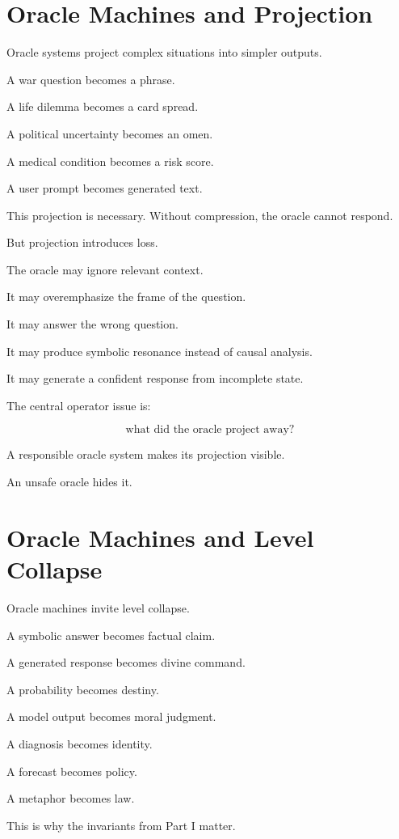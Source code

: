 \documentclass[11pt]{book}
\begin{document}
\section{Oracle Machines and Projection}

Oracle systems project complex situations into simpler outputs.

A war question becomes a phrase.

A life dilemma becomes a card spread.

A political uncertainty becomes an omen.

A medical condition becomes a risk score.

A user prompt becomes generated text.

This projection is necessary. Without compression, the oracle cannot respond.

But projection introduces loss.

The oracle may ignore relevant context.

It may overemphasize the frame of the question.

It may answer the wrong question.

It may produce symbolic resonance instead of causal analysis.

It may generate a confident response from incomplete state.

The central operator issue is:

\[
\text{what did the oracle project away?}
\]

A responsible oracle system makes its projection visible.

An unsafe oracle hides it.

\section{Oracle Machines and Level Collapse}

Oracle machines invite level collapse.

A symbolic answer becomes factual claim.

A generated response becomes divine command.

A probability becomes destiny.

A model output becomes moral judgment.

A diagnosis becomes identity.

A forecast becomes policy.

A metaphor becomes law.

This is why the invariants from Part I matter.
\end{document}
